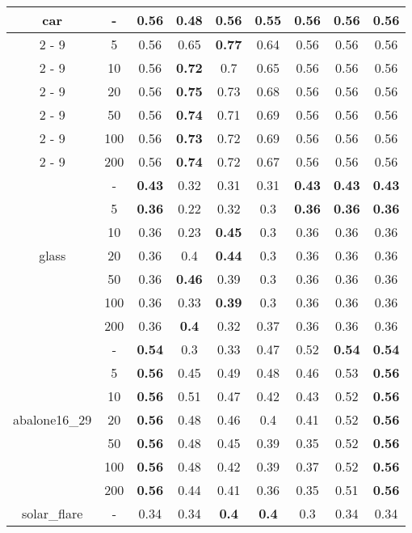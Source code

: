 \documentclass{article}%
\begin{document}
\begin{longtable}{c|c|ccccccc}
\hline%
\multirow{7}{*}{car}&{-}&\textbf{0.56}&0.48&\textbf{0.56}&0.55&\textbf{0.56}&\textbf{0.56}&\textbf{0.56}\\%
\cline{2%
-%
9}%
&5&0.56&0.65&\textbf{0.77}&0.64&0.56&0.56&0.56\\%
\cline{2%
-%
9}%
&10&0.56&\textbf{0.72}&0.7&0.65&0.56&0.56&0.56\\%
\cline{2%
-%
9}%
&20&0.56&\textbf{0.75}&0.73&0.68&0.56&0.56&0.56\\%
\cline{2%
-%
9}%
&50&0.56&\textbf{0.74}&0.71&0.69&0.56&0.56&0.56\\%
\cline{2%
-%
9}%
&100&0.56&\textbf{0.73}&0.72&0.69&0.56&0.56&0.56\\%
\cline{2%
-%
9}%
&200&0.56&\textbf{0.74}&0.72&0.67&0.56&0.56&0.56\\%
\hline%
\multirow{7}{*}{glass}&{-}&\textbf{0.43}&0.32&0.31&0.31&\textbf{0.43}&\textbf{0.43}&\textbf{0.43}\\%
\cline{2%
-%
9}%
&5&\textbf{0.36}&0.22&0.32&0.3&\textbf{0.36}&\textbf{0.36}&\textbf{0.36}\\%
\cline{2%
-%
9}%
&10&0.36&0.23&\textbf{0.45}&0.3&0.36&0.36&0.36\\%
\cline{2%
-%
9}%
&20&0.36&0.4&\textbf{0.44}&0.3&0.36&0.36&0.36\\%
\cline{2%
-%
9}%
&50&0.36&\textbf{0.46}&0.39&0.3&0.36&0.36&0.36\\%
\cline{2%
-%
9}%
&100&0.36&0.33&\textbf{0.39}&0.3&0.36&0.36&0.36\\%
\cline{2%
-%
9}%
&200&0.36&\textbf{0.4}&0.32&0.37&0.36&0.36&0.36\\%
\hline%
\multirow{7}{*}{abalone16\_29}&{-}&\textbf{0.54}&0.3&0.33&0.47&0.52&\textbf{0.54}&\textbf{0.54}\\%
\cline{2%
-%
9}%
&5&\textbf{0.56}&0.45&0.49&0.48&0.46&0.53&\textbf{0.56}\\%
\cline{2%
-%
9}%
&10&\textbf{0.56}&0.51&0.47&0.42&0.43&0.52&\textbf{0.56}\\%
\cline{2%
-%
9}%
&20&\textbf{0.56}&0.48&0.46&0.4&0.41&0.52&\textbf{0.56}\\%
\cline{2%
-%
9}%
&50&\textbf{0.56}&0.48&0.45&0.39&0.35&0.52&\textbf{0.56}\\%
\cline{2%
-%
9}%
&100&\textbf{0.56}&0.48&0.42&0.39&0.37&0.52&\textbf{0.56}\\%
\cline{2%
-%
9}%
&200&\textbf{0.56}&0.44&0.41&0.36&0.35&0.51&\textbf{0.56}\\%
\hline%
\multirow{7}{*}{solar\_flare}&{-}&0.34&0.34&\textbf{0.4}&\textbf{0.4}&0.3&0.34&0.34\\%

\end{longtable}
\end{document}
